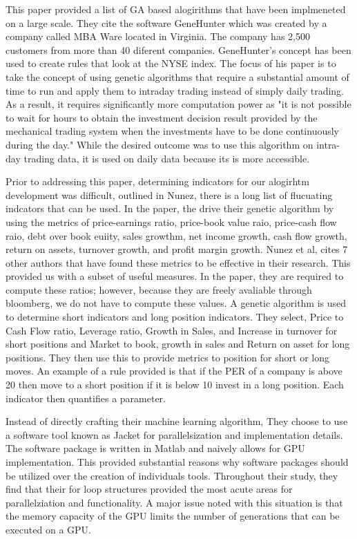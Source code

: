\documentclass[paper=letter, fontsize=11pt]{scrartcl}
\numberwithin{equation}{section}		%
\numberwithin{figure}{section}			%
\numberwithin{table}{section}				%
\begin{document}
\begin{spacing}{2}
This paper provided a list of GA based alogirithms that have been implmeneted on a large scale. They cite the software GeneHunter which was created by a company called MBA Ware located in Virginia. The company has 2,500 customers from more than 40 diferent companies. GeneHunter's concept has been used to create rules that look at the NYSE index. The focus of his paper is to take the concept of using genetic algorithms that require a substantial amount of time to run and apply them to intraday trading instead of simply daily trading. As a result, it requires significantly more computation power as "it is not possible to wait for hours to obtain the investment decision result provided by the mechanical trading system when the investments have to be done continuously during the day." While the desired outcome was to use this algorithm on intra-day trading data, it is used on daily data because its is more accessible. 

Prior to addressing this paper, determining indicators for our alogirhtm development was difficult, outlined in Nunez\cite{GA}, there is a long list of flucuating indcators that can be used. In the paper, the drive their genetic algorithm by using the metrics of price-earnings ratio, price-book value raio, price-cash flow raio, debt over book euiity, sales growthm, net income growth, cash flow growth, return on assets, turnover growth, and profit margin growth. Nunez et al, cites  7 other authors that have found these metrics to be effective in their research. This provided us with a subset of useful measures. In the paper, they are required to compute these ratios; however, because they are freely avaliable through bloomberg, we do not have to compute these values. A genetic algorithm is used to determine short indicators and long position indicators. They select, Price to Cash Flow ratio, Leverage ratio, Growth in Sales, and Increase in turnover for short positions and Market to book, growth in sales and Return on asset for long positions. They then use this to provide metrics to position for short or long moves. An example of a rule provided is that if the PER of a company is above 20 then move to a short position if it is below 10 invest in a long position. Each indicator then quantifies a parameter. 

Instead of directly crafting their machine learning algorithm, They choose to  use a software tool known as Jacket for parallelsization and implementation details. The software package is written in Matlab and naively allows for GPU implementation. This provided substantial reasons why software packages should be utilized over the creation of individuals tools. Throughout their study, they find that their for loop structures provided the most acute areas for parallelziation and functionality. A major issue noted with this situation is that the memory capacity of the GPU limits the number of generations that can be executed on a GPU.


\end{spacing}
\end{document}
